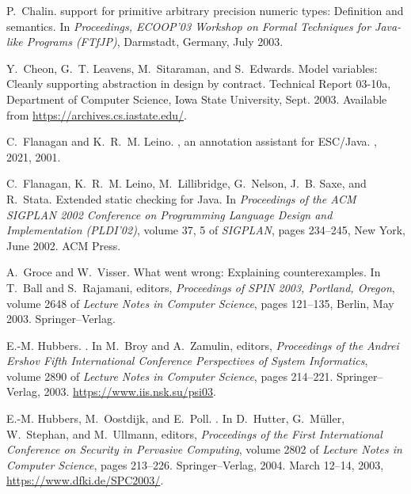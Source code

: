 \documentclass{sig-alternate}
\begin{document}
\begin{thebibliography}{10}
P.~Chalin.
 support for primitive arbitrary precision numeric types:
  Definition and semantics.
\newblock In {\em Proceedings, {ECOOP'03} Workshop on Formal Techniques for
  Java-like Programs ({FTfJP})}, Darmstadt, Germany, July 2003.

Y.~Cheon, G.~T. Leavens, M.~Sitaraman, and S.~Edwards.
\newblock Model variables: Cleanly supporting abstraction in design by
  contract.
\newblock Technical Report 03-10a, Department of Computer Science, Iowa State
  University, Sept. 2003.
\newblock Available from \url{https://archives.cs.iastate.edu/}.

C.~Flanagan and K.~R.~M. Leino.
, an annotation assistant for {ESC/Java}.
, 2021, 2001.

C.~Flanagan, K.~R.~M. Leino, M.~Lillibridge, G.~Nelson, J.~B. Saxe, and
  R.~Stata.
\newblock Extended static checking for {Java}.
\newblock In {\em Proceedings of the {ACM} {SIGPLAN} 2002 Conference on
  Programming Language Design and Implementation ({PLDI}'02)}, volume 37, 5 of
  {\em SIGPLAN}, pages 234--245, New York, June 2002. ACM Press.

A.~Groce and W.~Visser.
\newblock What went wrong: Explaining counterexamples.
\newblock In T.~Ball and S.~Rajamani, editors, {\em Proceedings of SPIN 2003,
  Portland, Oregon}, volume 2648 of {\em Lecture Notes in Computer Science},
  pages 121--135, Berlin, May 2003. Springer--Verlag.

E.-M. Hubbers.
.
\newblock In M.~Broy and A.~Zamulin, editors, {\em {Proceedings of the Andrei
  Ershov Fifth International Conference Perspectives of System Informatics}},
  volume 2890 of {\em Lecture Notes in Computer Science}, pages 214--221.
  Springer--Verlag, 2003.
\newblock \url{https://www.iis.nsk.su/psi03}.

E.-M. Hubbers, M.~Oostdijk, and E.~Poll.
.
\newblock In D.~Hutter, G.~M{\"u}ller, W.~Stephan, and M.~Ullmann, editors,
  {\em {Proceedings of the First International Conference on Security in
  Pervasive Computing}}, volume 2802 of {\em Lecture Notes in Computer
  Science}, pages 213--226. Springer--Verlag, 2004.
\newblock March 12--14, 2003, \url{https://www.dfki.de/SPC2003/}.


\end{thebibliography}
\end{document}
